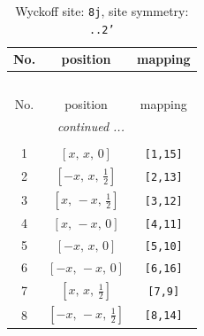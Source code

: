 \documentclass[fleqn,8pt]{jsarticle}
\begin{document}
\begin{longtable}{ccc}
\caption{Wyckoff site: {\tt 8j}, site symmetry: {\tt ..2'}}
 \\
 \hline \hline
No. & position & mapping \\ \hline \endfirsthead

\multicolumn{2}{l}{\tablename\ \thetable{}} \\
 \hline \hline
No. & position & mapping \\ \hline \endhead

 \hline \hline
\multicolumn{2}{r}{\footnotesize\it continued ...} \\ \endfoot

 \hline \hline
\multicolumn{2}{r}{} \\ \endlastfoot

1 & $\left[ x,\, x,\, 0 \right]$ & {\tt [1,15]} \\ \hline
2 & $\left[ - x,\, x,\, \frac{1}{2} \right]$ & {\tt [2,13]} \\ \hline
3 & $\left[ x,\, - x,\, \frac{1}{2} \right]$ & {\tt [3,12]} \\ \hline
4 & $\left[ x,\, - x,\, 0 \right]$ & {\tt [4,11]} \\ \hline
5 & $\left[ - x,\, x,\, 0 \right]$ & {\tt [5,10]} \\ \hline
6 & $\left[ - x,\, - x,\, 0 \right]$ & {\tt [6,16]} \\ \hline
7 & $\left[ x,\, x,\, \frac{1}{2} \right]$ & {\tt [7,9]} \\ \hline
8 & $\left[ - x,\, - x,\, \frac{1}{2} \right]$ & {\tt [8,14]} \\
\end{longtable}
\renewcommand{\arraystretch}{1.2}
\end{document}
